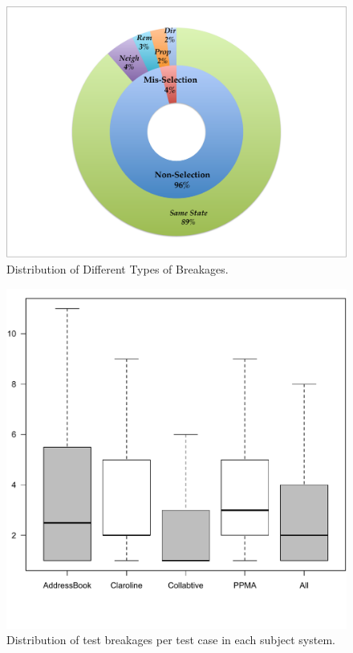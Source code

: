 \begin{figure}[t]
\centering
\includegraphics[trim={0cm 0cm 0cm 0cm},clip,scale=0.23]{images/donut}
\caption{Distribution of Different Types of Breakages.}
\label{donut}
\end{figure}

\begin{figure}[b]
\centering
\includegraphics[trim={0cm 0cm 0cm 0cm}, clip,width=0.8\columnwidth]{images/distribution.pdf}
\caption{Distribution of test breakages per test case in each subject system.}
\label{fig:distribution}
\end{figure} 

